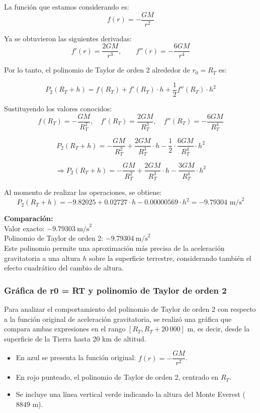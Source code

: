 \documentclass{article}
\begin{document}
La función que estamos considerando es:
\[
f(r) = -\frac{GM}{r^2}
\]

Ya se obtuvieron las siguientes derivadas:
\[
f'(r) = \frac{2GM}{r^3}, \qquad f''(r) = -\frac{6GM}{r^4}
\]

Por lo tanto, el polinomio de Taylor de orden 2 alrededor de $r_0 = R_T$ es:

\[
P_2(R_T + h) = f(R_T) + f'(R_T) \cdot h + \frac{1}{2} f''(R_T) \cdot h^2
\]

Sustituyendo los valores conocidos:
\[
f(R_T) = -\frac{GM}{R_T^2}, \quad
f'(R_T) = \frac{2GM}{R_T^3}, \quad
f''(R_T) = -\frac{6GM}{R_T^4}
\]

\[
P_2(R_T + h) = -\frac{GM}{R_T^2} + \frac{2GM}{R_T^3} \cdot h - \frac{1}{2} \cdot \frac{6GM}{R_T^4} \cdot h^2
\]

\[
\Rightarrow P_2(R_T + h) = -\frac{GM}{R_T^2} + \frac{2GM}{R_T^3} \cdot h - \frac{3GM}{R_T^4} \cdot h^2
\]

Al momento de realizar las operaciones, se obtiene:
\[
P_2(R_T + h) = -9.82025 + 0.02727 \cdot h - 0.00000569 \cdot h^2 = -9.79304 \text{ m/s}^2
\]

\noindent \textbf{Comparación:}\\
Valor exacto: $-9.79303\ \text{m/s}^2$ \\
Polinomio de Taylor de orden 2: $-9.79304\ \text{m/s}^2$ \\


Este polinomio permite una aproximación más precisa de la aceleración gravitatoria a una altura $h$ sobre la superficie terrestre, considerando también el efecto cuadrático del cambio de altura.

\subsubsection{Gráfica de r0 = RT y polinomio de Taylor de orden 2}

Para analizar el comportamiento del polinomio de Taylor de orden 2 con respecto a la función original de aceleración gravitatoria, se realizó una gráfica que compara ambas expresiones en el rango $[R_T, R_T + 20\,000]$ m, es decir, desde la superficie de la Tierra hasta 20 km de altitud.

\begin{itemize}
    \item En azul se presenta la función original: $f(r) = -\dfrac{GM}{r^2}$.
    \item En rojo punteado, el polinomio de Taylor de orden 2, centrado en $R_T$.
    \item Se incluye una línea vertical verde indicando la altura del Monte Everest ($8849$ m).
\end{itemize}
\end{document}
